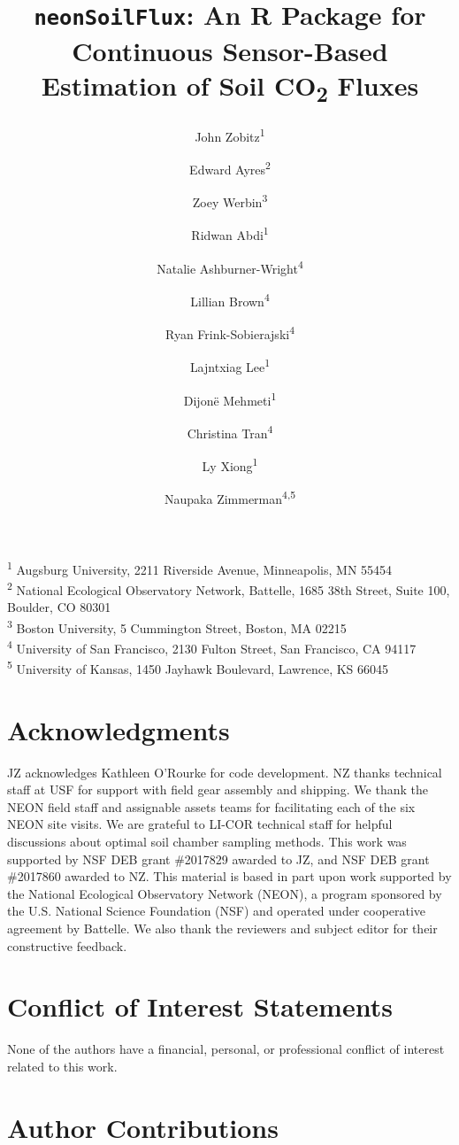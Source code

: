 \documentclass[
  letterpaper,
  DIV=11,
  numbers=noendperiod]{scrartcl}
\title{\texttt{neonSoilFlux}: An R Package for Continuous Sensor-Based
Estimation of Soil CO\textsubscript{2} Fluxes}
\author{John Zobitz\textsuperscript{1} \and Edward
Ayres\textsuperscript{2} \and Zoey Werbin\textsuperscript{3} \and Ridwan
Abdi\textsuperscript{1} \and Natalie
Ashburner-Wright\textsuperscript{4} \and Lillian
Brown\textsuperscript{4} \and Ryan
Frink-Sobierajski\textsuperscript{4} \and Lajntxiag
Lee\textsuperscript{1} \and Dijonë
Mehmeti\textsuperscript{1} \and Christina
Tran\textsuperscript{4} \and Ly Xiong\textsuperscript{1} \and Naupaka
Zimmerman\textsuperscript{4,5}}
\date{}
\begin{document}
\maketitle


\textsuperscript{1} Augsburg University, 2211 Riverside Avenue,
Minneapolis, MN 55454\\
\textsuperscript{2} National Ecological Observatory Network, Battelle,
1685 38th Street, Suite 100, Boulder, CO 80301\\
\textsuperscript{3} Boston University, 5 Cummington Street, Boston, MA
02215\\
\textsuperscript{4} University of San Francisco, 2130 Fulton Street, San
Francisco, CA 94117\\
\textsuperscript{5} University of Kansas, 1450 Jayhawk Boulevard,
Lawrence, KS 66045

\section*{Acknowledgments}\label{acknowledgments}

JZ acknowledges Kathleen O'Rourke for code development. NZ thanks
technical staff at USF for support with field gear assembly and
shipping. We thank the NEON field staff and assignable assets teams for
facilitating each of the six NEON site visits. We are grateful to LI-COR
technical staff for helpful discussions about optimal soil chamber
sampling methods. This work was supported by NSF DEB grant \#2017829
awarded to JZ, and NSF DEB grant \#2017860 awarded to NZ. This material
is based in part upon work supported by the National Ecological
Observatory Network (NEON), a program sponsored by the U.S. National
Science Foundation (NSF) and operated under cooperative agreement by
Battelle. We also thank the reviewers and subject editor for their
constructive feedback.

\section*{Conflict of Interest
Statements}\label{conflict-of-interest-statements}

None of the authors have a financial, personal, or professional conflict
of interest related to this work.

\section*{Author Contributions}\label{author-contributions}
\end{document}
